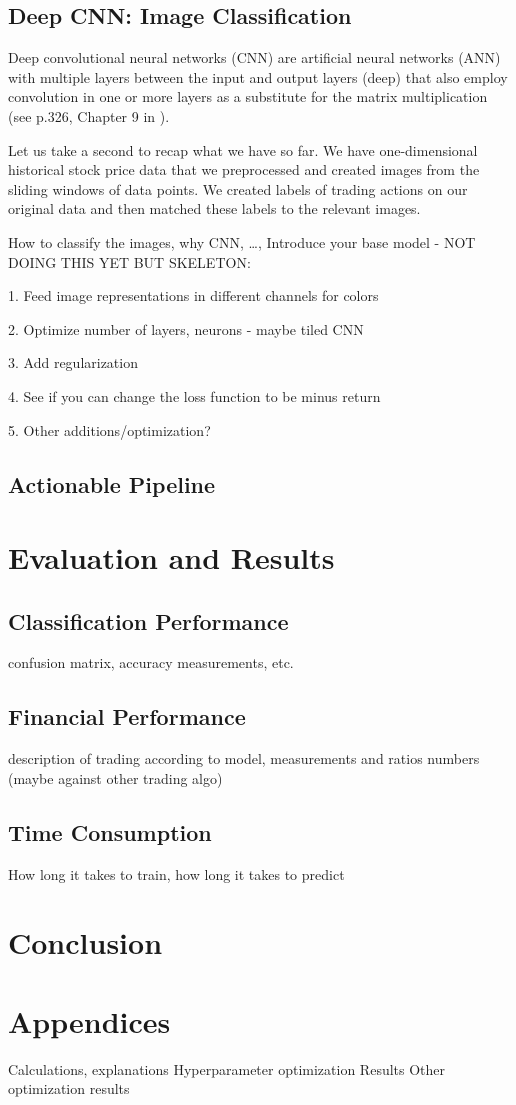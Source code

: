 \documentclass[11pt, a4paper]{article}
\begin{document}
\subsection{Deep CNN: Image Classification}
Deep convolutional neural networks (CNN) are artificial neural networks (ANN) with multiple layers between the input and output layers (deep) that also employ convolution in one or more layers 
as a substitute for the matrix multiplication (see p.326, Chapter 9 in \cite{goodfellow2016deep}). 

Let us take a second to recap what we have so far. We have one-dimensional historical stock price data that we preprocessed and created images from the sliding windows of data points. We created 
labels of trading actions on our original data and then matched these labels to the relevant images. 

How to classify the images, why CNN, \dots, 
Introduce your base model - NOT DOING THIS YET BUT SKELETON:

1. Feed image representations in different channels for colors

2. Optimize number of layers, neurons - maybe tiled CNN

3. Add regularization

4. See if you can change the loss function to be minus return

5. Other additions/optimization?

\subsection{Actionable Pipeline}

\section{Evaluation and Results}

\subsection{Classification Performance}
confusion matrix, accuracy measurements, etc.

\subsection{Financial Performance}
description of trading according to model, measurements and ratios
numbers (maybe against other trading algo)

\subsection{Time Consumption}
How long it takes to train, how long it takes to predict

\section{Conclusion}

\section{Appendices}
Calculations, explanations
Hyperparameter optimization Results
Other optimization results



\end{document}

